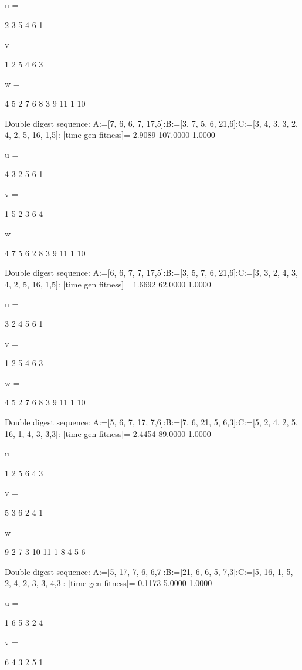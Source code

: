 u =

     2     3     5     4     6     1


v =

     1     2     5     4     6     3


w =

     4     5     2     7     6     8     3     9    11     1    10

Double digest sequence:
A:=[7, 6, 6, 7, 17,5]:B:=[3, 7, 5, 6, 21,6]:C:=[3, 4, 3, 3, 2, 4, 2, 5, 16, 1,5]:
[time gen fitness]=
    2.9089  107.0000    1.0000


u =

     4     3     2     5     6     1


v =

     1     5     2     3     6     4


w =

     4     7     5     6     2     8     3     9    11     1    10

Double digest sequence:
A:=[6, 6, 7, 7, 17,5]:B:=[3, 5, 7, 6, 21,6]:C:=[3, 3, 2, 4, 3, 4, 2, 5, 16, 1,5]:
[time gen fitness]=
    1.6692   62.0000    1.0000


u =

     3     2     4     5     6     1


v =

     1     2     5     4     6     3


w =

     4     5     2     7     6     8     3     9    11     1    10

Double digest sequence:
A:=[5, 6, 7, 17, 7,6]:B:=[7, 6, 21, 5, 6,3]:C:=[5, 2, 4, 2, 5, 16, 1, 4, 3, 3,3]:
[time gen fitness]=
    2.4454   89.0000    1.0000


u =

     1     2     5     6     4     3


v =

     5     3     6     2     4     1


w =

     9     2     7     3    10    11     1     8     4     5     6

Double digest sequence:
A:=[5, 17, 7, 6, 6,7]:B:=[21, 6, 6, 5, 7,3]:C:=[5, 16, 1, 5, 2, 4, 2, 3, 3, 4,3]:
[time gen fitness]=
    0.1173    5.0000    1.0000


u =

     1     6     5     3     2     4


v =

     6     4     3     2     5     1



